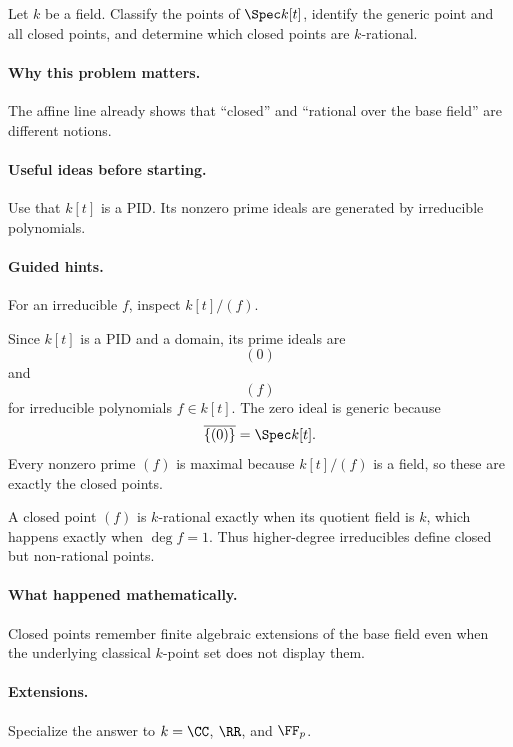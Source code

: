 \begin{problem}
Let $k$ be a field.  Classify the points of $\Spec k[t]$, identify the generic point and
all closed points, and determine which closed points are $k$-rational.
\end{problem}

\paragraph{Why this problem matters.}
The affine line already shows that ``closed'' and ``rational over the base field'' are
different notions.

\paragraph{Useful ideas before starting.}
Use that $k[t]$ is a PID.  Its nonzero prime ideals are generated by irreducible
polynomials.

\paragraph{Guided hints.}
For an irreducible $f$, inspect $k[t]/(f)$.

\begin{solution}
Since $k[t]$ is a PID and a domain, its prime ideals are
\[
(0)
\]
and
\[
(f)
\]
for irreducible polynomials $f\in k[t]$.  The zero ideal is generic because
\[
\overline{\{(0)\}}=\Spec k[t].
\]
Every nonzero prime $(f)$ is maximal because $k[t]/(f)$ is a field, so these are exactly
the closed points.

A closed point $(f)$ is $k$-rational exactly when its quotient field is $k$, which happens
exactly when $\deg f=1$.  Thus higher-degree irreducibles define closed but non-rational
points.
\end{solution}

\paragraph{What happened mathematically.}
Closed points remember finite algebraic extensions of the base field even when the
underlying classical $k$-point set does not display them.

\paragraph{Extensions.}
Specialize the answer to $k=\CC$, $\RR$, and $\FF_p$.
